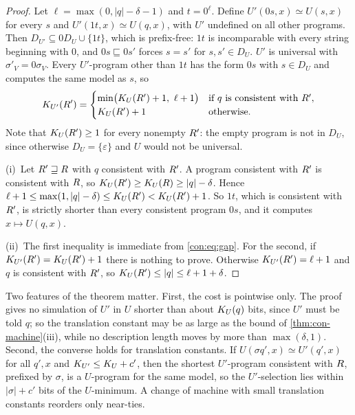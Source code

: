 \begin{proof}
Let $\ell=\max(0,|q|-\delta-1)$ and $t=0^\ell$. Define $U'(0s,x)\simeq U(s,x)$ for
every $s$ and $U'(1t,x)\simeq U(q,x)$, with $U'$ undefined on all other programs. Then
$D_{U'}\subseteq 0D_U\cup\{1t\}$, which is prefix-free: $1t$ is incomparable with
every string beginning with $0$, and $0s\sqsubseteq 0s'$ forces $s=s'$ for
$s,s'\in D_U$. $U'$ is universal with $\sigma'_V=0\sigma_V$. Every $U'$-program other
than $1t$ has the form $0s$ with $s\in D_U$ and computes the same model as $s$, so
\begin{equation}\label{con:eq:gap}
  K_{U'}(R')=
  \begin{cases}
    \min\bigl(K_{U}(R')+1,\ \ell+1\bigr) & \text{if $q$ is consistent with $R'$},\\
    K_{U}(R')+1 & \text{otherwise}.
  \end{cases}
\end{equation}
Note that $K_{U}(R')\ge1$ for every nonempty $R'$: the empty program is not in
$D_U$, since otherwise $D_U=\{\varepsilon\}$ and $U$ would not be universal.

(i)~Let $R'\sqsupseteq R$ with $q$ consistent with $R'$. A program consistent
with $R'$ is consistent with $R$, so $K_{U}(R')\ge K_{U}(R)\ge|q|-\delta$.
Hence $\ell+1\le\max(1,|q|-\delta)\le K_{U}(R')<K_{U}(R')+1$. So $1t$, which is
consistent with $R'$, is strictly shorter than every consistent program $0s$, and it
computes $x\mapsto U(q,x)$.

(ii)~The first inequality is immediate from \eqref{con:eq:gap}. For the second, if
$K_{U'}(R')=K_{U}(R')+1$ there is nothing to prove. Otherwise
$K_{U'}(R')=\ell+1$ and $q$ is consistent with $R'$, so
$K_{U}(R')\le|q|\le\ell+1+\delta$.
\end{proof}

Two features of the theorem matter. First, the cost is pointwise only. The proof gives
no simulation of $U'$ in $U$ shorter than about $K_{U}(q)$ bits, since $U'$ must be
told $q$; so the translation constant may be as large as the bound of
\cref{thm:con-machine}(iii), while no description length moves by more than
$\max(\delta,1)$. Second, the converse holds for translation constants. If
$U(\sigma q',x)\simeq U'(q',x)$ for all $q',x$ and $K_{U'}\le K_{U}+c'$, then the
shortest $U'$-program consistent with $R$, prefixed by $\sigma$, is a $U$-program
for the same model, so the $U'$-selection lies within $|\sigma|+c'$ bits of the
$U$-minimum. A change of machine with small translation constants reorders only
near-ties.

